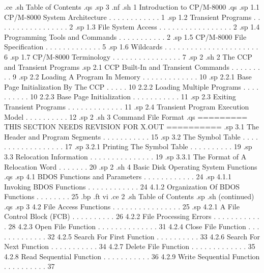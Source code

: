 .ce
.sh
Table of Contents
.qs
.sp 3
.nf
.sh
1  Introduction to CP/M-8000  
.qs
.sp
   1.1  CP/M-8000 System Architecture  . . . . . . . . . . . .   1 
.sp
   1.2  Transient Programs  . . . . . . . . . . . . . . . . .   2 
.sp
   1.3  File System Access  . . . . . . . . . . . . . . . . .   2 
.sp
   1.4  Programming Tools and Commands  . . . . . . . . . . .   2 
.sp
   1.5  CP/M-8000 File Specification . . . . . . . . . . . . .   5 
.sp
   1.6  Wildcards . . . . . . . . . . . . . . . . . . . . . .   6 
.sp
   1.7  CP/M-8000 Terminology  . . . . . . . . . . . . . . . .   7 
.sp 2
.sh
2  The CCP and Transient Programs 
.sp
   2.1  CCP Built-In and Transient Commands . . . . . . . . .   9 
.sp
   2.2  Loading A Program In Memory . . . . . . . . . . . . .  10 
.sp
        2.2.1  Base Page Initialization By The CCP  . . . . .  10 
        2.2.2  Loading Multiple Programs  . . . . . . . . . .  10 
        2.2.3  Base Page Initialization . . . . . . . . . . .  11 
.sp
   2.3  Exiting Transient Programs  . . . . . . . . . . . . .  11 
.sp
   2.4  Transient Program Execution Model . . . . . . . . . .  12 
.sp 2
.sh
3  Command File Format  
.qs
========= THIS SECTION NEEDS REVISION FOR X.OUT ==========
.sp
   3.1  The Header and Program Segments . . . . . . . . . . .  15 
.sp
   3.2  The Symbol Table  . . . . . . . . . . . . . . . . . .  17 
.sp
        3.2.1  Printing The Symbol Table  . . . . . . . . . .  19 
.sp
   3.3  Relocation Information  . . . . . . . . . . . . . . .  19 
.sp
        3.3.1  The Format of A Relocation Word  . . . . . . .  20 
.sp 2
.sh
4  Basic Disk Operating System Functions  
.qs
.sp
   4.1  BDOS Functions and Parameters . . . . . . . . . . . .  24 
.sp
        4.1.1 Invoking BDOS Functions . . . . . . . . . . . .  24 
        4.1.2  Organization Of BDOS Functions . . . . . . . .  25 
.bp
.ft                                 vi
.ce 2
.sh
Table of Contents
.sp
.sh
(continued)
.qs
.sp 3
   4.2  File Access Functions . . . . . . . . . . . . . . . .  25 
.sp
        4.2.1  A File Control Block (FCB) . . . . . . . . . .  26 
        4.2.2  File Processing Errors . . . . . . . . . . . .  28 
        4.2.3  Open File Function . . . . . . . . . . . . . .  31 
        4.2.4  Close File Function  . . . . . . . . . . . . .  32 
        4.2.5  Search For First Function  . . . . . . . . . .  33 
        4.2.6  Search For Next Function . . . . . . . . . . .  34 
        4.2.7  Delete File Function . . . . . . . . . . . . .  35 
        4.2.8  Read Sequential Function . . . . . . . . . . .  36 
        4.2.9  Write Sequential Function  . . . . . . . . . .  37 
